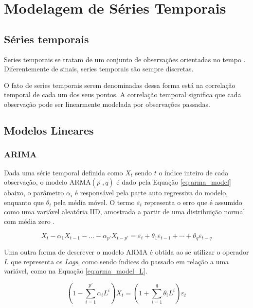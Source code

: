 \chapter{Modelagem de Séries Temporais}
\label{cap:series_temp}

\section{Séries temporais}


Series temporais se tratam de um conjunto de observações orientadas no tempo \cite{brockwell2002introduction}. Diferentemente de sinais, series temporais são sempre discretas.

O fato de series temporais serem denominadas dessa forma está na correlação temporal de cada um dos seus pontos. A correlação temporal significa que cada observação pode ser linearmente modelada por observações passadas. 

\section{Modelos Lineares}

\subsection{ARIMA}

Dada uma série temporal definida como $X_t$ sendo $t$ o índice inteiro de cada observação, o modelo ARMA$(p^{'},q)$ é dado pela Equação \ref{eq:arma_model} abaixo, o parâmetro $\alpha_i$ é responsável pela parte auto regressiva do modelo, enquanto que $\theta_i$ pela média móvel. O termo $\varepsilon_t$ representa o erro que é assumido como uma variável aleatória IID, amostrada a partir de uma distribuição normal com média zero \cite{brockwell2002introduction}. 

\begin{equation}
\label{eq:arma_model}
    X_t-\alpha_1X_{t-1}- \dots -\alpha_{p'}X_{t-p'} = \varepsilon_t + \theta_1 \varepsilon_{t-1} + \cdots +\theta_q \varepsilon_{t-q}
\end{equation}

Uma outra forma de descrever o modelo ARMA é obtida ao se utilizar o operador $L$ que representa os \textit{Lags}, como sendo índices do passado em relação a uma variável, como na Equação \ref{eq:arma_model_L}.

\begin{equation}
\label{eq:arma_model_L}
    \left(1 - \sum_{i=1}^{p'} \alpha_i L^i\right) X_t=\left(1 + \sum_{i=1}^q \theta_i L^i\right) \varepsilon_t
\end{equation}

